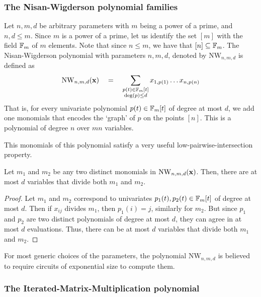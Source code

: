\documentclass{beatcs}
\newcommand{\NW}{\mathrm{NW}}
\newcommand{\spaced}[1]{\quad#1\quad}
\begin{document}
\subsubsection*{The Nisan-Wigderson polynomial families}

Let $n,m,d$ be arbitrary parameters with $m$ being a power of a prime, and $n,d\leq m$. Since $m$ is a power of a prime, let us identify the set $[m]$ with the field $\mathbb{F}_m$ of $m$ elements. Note that since $n \leq m$, we have that $[n] \subseteq \mathbb{F}_m$. The Nisan-Wigderson polynomial with parameters $n,m,d$, denoted by $\mathrm{NW}_{n,m,d}$ is defined as
\[
\NW_{n,m,d}(\vecx) \spaced{=} \sum_{\substack{p(t) \in \F_m[t]\\ \deg(p) \leq d}} x_{1,p(1)}\dots x_{n,p(n)}
\]
That is, for every univariate polynomial $p(t) \in \mathbb{F}_m[t]$ of degree at most $d$, we add one monomials that encodes the `graph' of $p$ on the points $[n]$. This is a polynomial of degree $n$ over $mn$ variables.

This monomials of this polynomial satisfy a very useful low-pairwise-intersection property. 

\begin{lemma}\label{lem:NW-low-intersection}
Let $m_1$ and $m_2$ be any two distinct monomials in $\NW_{n,m,d}(\vecx)$. Then, there are at most $d$ variables that divide both $m_1$ and $m_2$. 
\end{lemma}
\begin{proof}
Let $m_1$ and $m_2$ correspond to univariates $p_1(t), p_2(t) \in \mathbb{F}_m[t]$ of degree at most $d$. Then if $x_{ij}$ divides $m_1$, then $p_1(i) = j$, similarly for $m_2$. But since $p_1$ and $p_2$ are two distinct polynomials of degree at most $d$, they can agree in at most $d$ evaluations. Thus, there can be at most $d$ variables that divide both $m_1$ and $m_2$. 
\end{proof}

For most generic choices of the parameters, the polynomial $\NW_{n,m,d}$ is believed to require circuits of exponential size to compute them. 

\subsubsection*{The Iterated-Matrix-Multiplication polynomial}
\end{document}

